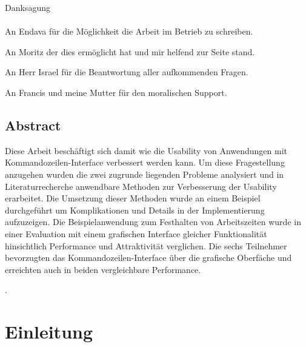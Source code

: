\documentclass[oneside,bibliography=totocnumbered,BCOR=5mm]{scrbook}
\begin{document}
\thispagestyle{empty}
\vspace*{2.2cm}
\noindent
{\Huge Danksagung}\\
\vspace*{1.6cm} \\


An Endava für die Möglichkeit die Arbeit im Betrieb zu schreiben.

\medskip

An Moritz der dies ermöglicht hat und mir helfend zur Seite stand.

\medskip

An Herr Israel für die Beantwortung aller aufkommenden Fragen.

\medskip

An Francis und meine Mutter für den moralischen Support.

\newpage
\thispagestyle{empty}

\section*{Abstract}


Diese Arbeit beschäftigt sich damit wie die Usability von Anwendungen mit
Kommandozeilen-Interface verbessert werden kann. Um diese Fragestellung
anzugehen wurden die zwei zugrunde liegenden Probleme analysiert und in
Literaturrecherche anwendbare Methoden zur Verbesserung der Usability
erarbeitet. Die Umsetzung dieser Methoden wurde an einem Beispiel durchgeführt
um Komplikationen und Details in der Implementierung aufzuzeigen. Die
Beispielanwendung zum Festhalten von Arbeitszeiten wurde in einer Evaluation
mit einem grafischen Interface gleicher Funktionalität hinsichtlich
Performance und Attraktivität verglichen. Die sechs Teilnehmer bevorzugten das
Kommandozeilen-Interface über die grafische Oberfäche und erreichten auch in
beiden vergleichbare Performance.

\clearpage
{}
\tableofcontents
.
\newpage

\chapter{Einleitung}
\label{sec:einleitung}
\end{document}
